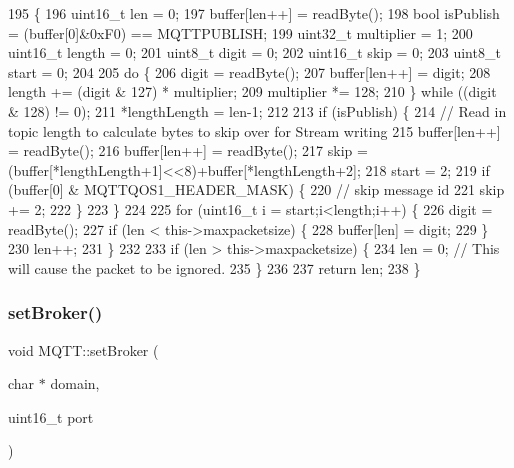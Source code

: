 \begin{DoxyCode}
195                                                \{
196     uint16\_t len = 0;
197     buffer[len++] = readByte();
198     \textcolor{keywordtype}{bool} isPublish = (buffer[0]&0xF0) == MQTTPUBLISH;
199     uint32\_t multiplier = 1;
200     uint16\_t length = 0;
201     uint8\_t digit = 0;
202     uint16\_t skip = 0;
203     uint8\_t start = 0;
204 
205     \textcolor{keywordflow}{do} \{
206         digit = readByte();
207         buffer[len++] = digit;
208         length += (digit & 127) * multiplier;
209         multiplier *= 128;
210     \} \textcolor{keywordflow}{while} ((digit & 128) != 0);
211     *lengthLength = len-1;
212 
213     \textcolor{keywordflow}{if} (isPublish) \{
214         \textcolor{comment}{// Read in topic length to calculate bytes to skip over for Stream writing}
215         buffer[len++] = readByte();
216         buffer[len++] = readByte();
217         skip = (buffer[*lengthLength+1]<<8)+buffer[*lengthLength+2];
218         start = 2;
219         \textcolor{keywordflow}{if} (buffer[0] & MQTTQOS1_HEADER_MASK) \{
220             \textcolor{comment}{// skip message id}
221             skip += 2;
222         \}
223     \}
224 
225     \textcolor{keywordflow}{for} (uint16\_t i = start;i<length;i++) \{
226         digit = readByte();
227         \textcolor{keywordflow}{if} (len < this->maxpacketsize) \{
228             buffer[len] = digit;
229         \}
230         len++;
231     \}
232 
233     \textcolor{keywordflow}{if} (len > this->maxpacketsize) \{
234         len = 0; \textcolor{comment}{// This will cause the packet to be ignored.}
235     \}
236 
237     \textcolor{keywordflow}{return} len;
238 \}
\end{DoxyCode}
\mbox{\label{class_m_q_t_t_a07b3b97bcf999a2d0a292bca4f29bbc7}} 
\subsubsection{set\+Broker()\hspace{0.1cm}{\footnotesize\ttfamily [1/2]}}
{\footnotesize\ttfamily void M\+Q\+T\+T\+::set\+Broker (\begin{DoxyParamCaption}\item[{char $\ast$}]{domain,  }\item[{uint16\+\_\+t}]{port }\end{DoxyParamCaption})}



